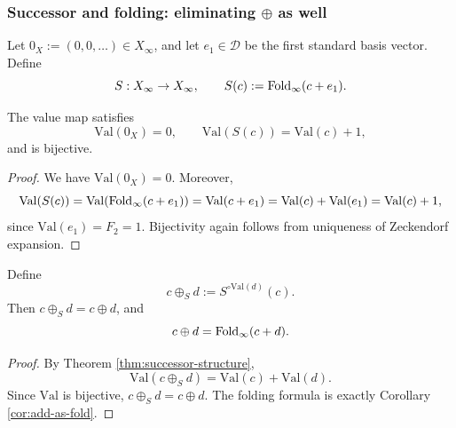 \subsubsection{Successor and folding: eliminating \texorpdfstring{$\oplus$}{oplus} as well}\label{subsec:succ-and-fold}
\begin{definition}\label{def:successor-fold}
Let \(0_X:=(0,0,\dots)\in X_\infty\), and let \(e_1\in\mathcal{D}\) be the first standard basis vector. Define
\[
S:X_\infty\to X_\infty,
\qquad
S(c):=\operatorname{Fold}_\infty(c+e_1).
\]
\end{definition}

\begin{theorem}\label{thm:successor-structure}
The value map satisfies
\[
\mathrm{Val}(0_X)=0,
\qquad
\mathrm{Val}(S(c))=\mathrm{Val}(c)+1,
\]
and is bijective.
\end{theorem}

\begin{proof}
We have \(\mathrm{Val}(0_X)=0\). Moreover,
\[
\mathrm{Val}(S(c))
=\mathrm{Val}(\operatorname{Fold}_\infty(c+e_1))
=\mathrm{Val}(c+e_1)
=\mathrm{Val}(c)+\mathrm{Val}(e_1)
=\mathrm{Val}(c)+1,
\]
since \(\mathrm{Val}(e_1)=F_2=1\). Bijectivity again follows from uniqueness of Zeckendorf expansion.
\end{proof}

\begin{corollary}\label{cor:add-from-successor}
Define
\[
c\oplus_S d:=S^{\circ\mathrm{Val}(d)}(c).
\]
Then \(c\oplus_S d=c\oplus d\), and
\[
c\oplus d=\operatorname{Fold}_\infty(c+d).
\]
\end{corollary}

\begin{proof}
By Theorem \ref{thm:successor-structure},
\[
\mathrm{Val}(c\oplus_S d)=\mathrm{Val}(c)+\mathrm{Val}(d).
\]
Since \(\mathrm{Val}\) is bijective, \(c\oplus_S d=c\oplus d\). The folding formula is exactly Corollary \ref{cor:add-as-fold}.
\end{proof}


